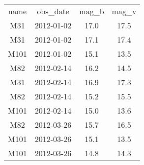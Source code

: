 \begin{table}
\begin{tabular}{cccc}
name & obs_date & mag_b & mag_v \\
M31 & 2012-01-02 & 17.0 & 17.5 \\
M31 & 2012-01-02 & 17.1 & 17.4 \\
M101 & 2012-01-02 & 15.1 & 13.5 \\
M82 & 2012-02-14 & 16.2 & 14.5 \\
M31 & 2012-02-14 & 16.9 & 17.3 \\
M82 & 2012-02-14 & 15.2 & 15.5 \\
M101 & 2012-02-14 & 15.0 & 13.6 \\
M82 & 2012-03-26 & 15.7 & 16.5 \\
M101 & 2012-03-26 & 15.1 & 13.5 \\
M101 & 2012-03-26 & 14.8 & 14.3 \\
\end{tabular}
\end{table}
